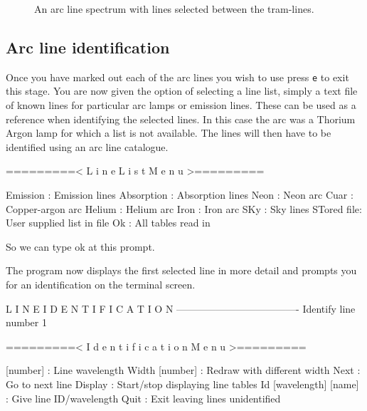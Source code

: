 \documentclass[twoside,11pt]{starlink}
\providecommand{\scspec}[2]{#1}
\begin{document}
\begin{figure}
\begin{center}
  \parbox{140mm}{
    \caption{An arc line spectrum with lines selected between the
             tram-lines.}
    \label{arc_select}
  }
\end{center}
\end{figure}


\subsection{Arc line identification}

Once you have marked out each of the arc lines you wish to use press
\texttt{e} to exit this stage. You are now given the option of selecting
a line list, simply a text file of known lines for particular arc
lamps or emission lines. These can be used as a reference when
identifying the selected lines. In this case the arc was a Thorium
Argon lamp for which a list is not available. The lines will then have
to be identified using an arc line catalogue.
\goodbreak

{\scspec{\small}{ }
\begin{terminalv}
=========< L i n e   L i s t   M e n u >=========

Emission   : Emission lines
Absorption : Absorption lines
Neon       : Neon arc
Cuar       : Copper-argon arc
Helium     : Helium arc
Iron       : Iron arc
SKy        : Sky lines
STored file: User supplied list in file
Ok         : All tables read in
\end{terminalv}
}

So we can type ok at this prompt.

The program now displays the first selected line in more detail and
prompts you for an identification on the terminal screen.

{\scspec{\small}{ }
\begin{terminalv}
L I N E   I D E N T I F I C A T I O N
-------------------------------------
Identify line number  1

=========< I d e n t i f i c a t i o n   M e n u >=========

[number]               : Line wavelength
Width [number]         : Redraw with different width
Next                   : Go to next line
Display                : Start/stop displaying line tables
Id [wavelength] [name] : Give line ID/wavelength
Quit                   : Exit leaving lines unidentified

\end{terminalv}
}
\end{document}
